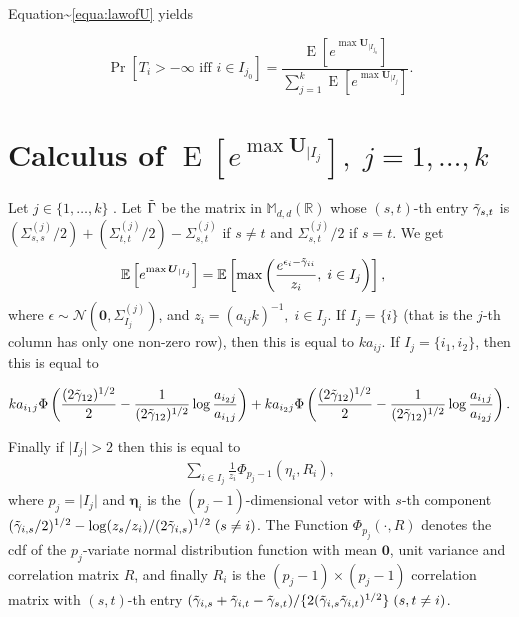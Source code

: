 \documentclass[
]{article}
\begin{document}
Equation\textasciitilde{}\eqref{equa:lawofU} yields

\begin{equation}
\Pr[T_i>-\infty \text{ iff } i \in I_{j_0} ]=\frac{\operatorname{E}[e^{\max \boldsymbol{U}_{\mid I_{j_0}}}]}{ \sum_{j=1}^k \operatorname{E}[e^{\max \boldsymbol{U}_{\mid I_{j}}}] }. \label{equa:T}
\end{equation}

\section{Calculus of $\operatorname{E}[e^{\max \boldsymbol{U}_{\mid I_j}}], \; j=1,\ldots,k$}

Let \(j \in \{1,\ldots,k\}\) . Let \(\Tilde{\Gamma}\) be the matrix in
\(\mathbb{M}_{d,d}(\mathbb{R})\) whose \((s,t)\)-th entry
\(\Tilde{\gamma}_{s,t}\) is
\((\Sigma^{(j)}_{s,s}/2)+ (\Sigma^{(j)}_{t,t}/2)-\Sigma^{(j)}_{s,t}\) if
\(s\neq t\) and \(\Sigma^{(j)}_{s,t}/2\) if \(s=t\). We get \[
\begin{aligned}
\mathbb{E}\left[e^{\max \boldsymbol{U}_{\mid I_j} }\right]
&=\mathbb{E}\left[\max\left( \frac{e^{\epsilon_{i} -\Tilde{\gamma}_{ii}}}{z_i }, \; i \in I_{j}\right)\right],
\end{aligned}
\] where
\(\epsilon \sim \mathcal{N}(\boldsymbol{0}, \Sigma_{I_j}^{(j)} )\), and
\(z_i=(a_{ij}k)^{-1}, \; i \in I_j\). If \(I_j= \{i\}\) (that is the
\(j\)-th column has only one non-zero row), then this is equal to
\(ka_{i j}\). If \(I_j=\{i_1,i_2\}\), then this is equal to

\[
ka_{i_1j}\Phi\left(\frac{(2\Tilde{\gamma}_{12})^{1/2}}{2} - \frac{1}{(2\Tilde{\gamma}_{12})^{1/2}} \log \frac{a_{i_2j}}{a_{i_1j}}\right)+
ka_{i_2j}\Phi\left(\frac{(2\Tilde{\gamma}_{12})^{1/2}}{2} - \frac{1}{(2\Tilde{\gamma}_{12})^{1/2}} \log \frac{a_{i_1j}}{a_{i_2j}}\right).
\]

Finally if \(\lvert I_j \rvert >2\) then this is equal to \[
\begin{aligned}
\sum_{i \in I_j}\frac{1}{z_i} \Phi_{p_j-1}(\eta_i, R_i),
\end{aligned}
\] where \(p_{j}= \lvert I_j \rvert\) and \(\boldsymbol{\eta}_{i}\) is
the \((p_{j}-1)\)-dimensional vetor with \(s\)-th component
\((\Tilde{\gamma}_{i,s}/2)^{1/2}-\log(z_s/z_i)/(2\Tilde{\gamma}_{i,s})^{1/2} \; (s \neq i)\).
The Function \(\Phi_{p_j}(\cdot, R)\) denotes the cdf of the
\(p_j\)-variate normal distribution function with mean
\(\boldsymbol{0}\), unit variance and correlation matrix \(R\), and
finally \(R_i\) is the \((p_j-1) \times (p_j-1)\) correlation matrix
with \((s,t)\)-th entry
\((\Tilde{\gamma}_{i,s}+\Tilde{\gamma}_{i,t}-\Tilde{\gamma}_{s,t})/\{2(\Tilde{\gamma}_{i,s}\Tilde{\gamma}_{i,t})^{1/2}\}\; (s,t \neq i)\).
\end{document}
